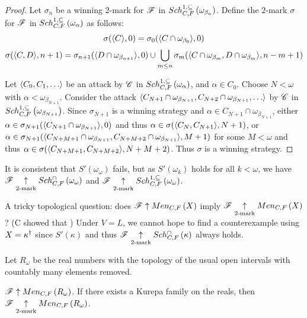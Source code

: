 \documentclass[11pt]{article}
\begin{document}
  \begin{proof}
    Let \(\sigma_n\) be a winning \(2\)-mark for \(\mathscr{F}\) in
    \(Sch^{1,\subseteq}_{C,F}\left({\omega_{\beta_n}}\right)\). Define the \(2\)-mark \(\sigma\)
    for \(\mathscr{F}\) in \(Sch^{1,\subseteq}_{C,F}\left({\omega_\alpha}\right)\) as follows:
    \[
      \sigma(\langle C\rangle,0)
        =
      \sigma_0(\langle C\cap\omega_{\beta_0}\rangle,0)
    \]
    \[
      \sigma(\langle C,D\rangle,n+1)
        =
      \sigma_{n+1}(\langle D\cap\omega_{\beta_{n+1}}\rangle,0)
        \cup
      \bigcup_{m\leq n}
      \sigma_m(\langle C\cap\omega_{\beta_m},D\cap\omega_{\beta_m}\rangle,n-m+1)
    \]

    Let \(\<C_0,C_1,\dots\>\) be an attack by
    \(\mathscr{C}\) in \(Sch^{1,\subseteq}_{C,F}\left({\omega_\alpha}\right)\), and
    \(\alpha\in C_0\).
    Choose \(N<\omega\) with \(\alpha<\omega_{\beta_{N+1}}\). Consider the
    attack
    \(\<C_{N+1}\cap\omega_{\beta_{N+1}},C_{N+2}\cap\omega_{\beta_{N+1}},\dots\>\)
    by \(\mathscr{C}\) in \(Sch^{1,\subseteq}_{C,F}\left({\omega_{\beta_{N+1}}}\right)\). Since
    \(\sigma_{N+1}\) is a winning strategy and
    \(\alpha\in C_{N+1}\cap\omega_{\beta_{N+1}}\), either
    \(\alpha\in\sigma_{N+1}(\langle C_{N+1}\cap\omega_{\beta_{N+1}}\rangle,0)\) and thus
    \(\alpha\in\sigma(\langle C_N,C_{N+1}\rangle,N+1)\), or
    \(
      \alpha
        \in
      \sigma_{N+1}(
        \langle C_{N+M+1}\cap\omega_{\beta_{N+1}},C_{N+M+2}\cap\omega_{\beta_{N+1}}\rangle
        ,M+1
      )
    \)
    for some \(M<\omega\) and thus
    \(
      \alpha
        \in
      \sigma(
        \langle C_{N+M+1},C_{N+M+2}\rangle,
        N+M+2
      )
    \). Thus \(\sigma\) is a winning strategy.
  \end{proof}

  \begin{corollary}
    It is consistent that \(S'(\omega_\omega)\) fails,
    but as \(S'(\omega_k)\) holds for all \(k<\omega\), we have
    \(\mathscr{F}\underset{2\text{-mark}}{\uparrow}Sch^{\cap}_{C,F}\left({\omega_\omega}\right)\) and
    \(\mathscr{F}\underset{2\text{-mark}}{\uparrow}Sch^{1,\subseteq}_{C,F}\left({\omega_\omega}\right)\).
  \end{corollary}

  A tricky topological question: does \(\mathscr{F}\uparrow Men_{C,F}\left({X}\right)\) imply
  \(\mathscr{F}\underset{2\text{-mark}}{\uparrow}Men_{C,F}\left({X}\right)\)?
  (C showed that )
  Under \(V=L\), we cannot hope to find
  a counterexample using \(X=\kappa^\dagger\) since
  \(S'(\kappa)\) and thus \(\mathscr{F}\underset{2\text{-mark}}{\uparrow}Sch^{\cap}_{C,F}\left({\kappa}\right)\)
  always holds.

  \begin{definition}
    Let \(R_\omega\) be the real numbers with the topology of the usual
    open intervals with countably many elements removed.
  \end{definition}

  \begin{theorem}
    \(\mathscr{F}\uparrow Men_{C,F}\left({R_\omega}\right)\).
    If there exists a Kurepa family on the reals, then
    \(\mathscr{F}\underset{2\text{-mark}}{\uparrow}Men_{C,F}\left({R_\omega}\right)\).
  \end{theorem}
\end{document}
